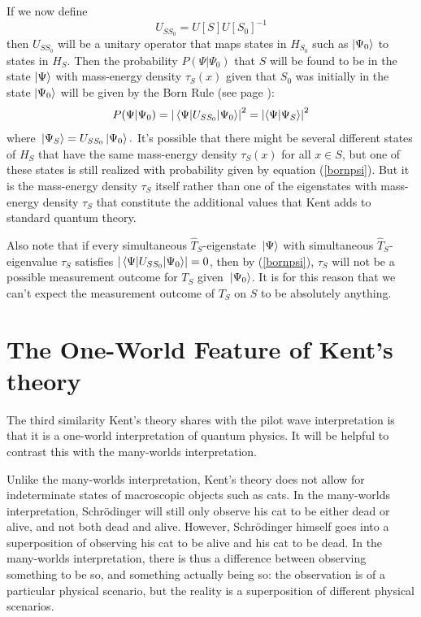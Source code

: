  If we now define 
 \begin{equation}\label{SchwingerUnitaryOP}
 U_{SS_0}=U[S]U[S_0]^{-1}
 \end{equation} 
 then $U_{SS_0}$ will be a unitary operator that maps states in $H_{S_0}$ such as $\ket{\Psi_0}$ to states in $H_S$. Then the probability $P(\Psi|\Psi_0)$ that  $S$ will be found to be in the state $\ket{\Psi}$ with mass-energy density $\tau_S(x)$ given that $S_0$ was initially in the state $\ket{\Psi_0}$ will be given by the Born Rule (see page \pageref{bornrule}):
 \begin{equation}\label{bornpsi}
 P(\Psi|\Psi_0) = \abs{\mel{\Psi}{U_{SS_0}}{\Psi_0}}^2=\abs{\ip{\Psi}{\Psi_S}}^2
 \end{equation}
 where $\ket*{\Psi_S}=U_{SS_0}\ket*{\Psi_0}.$
It's possible that there might be several different states of $H_S$ that have the same mass-energy density $\tau_S(x)$ for all $x\in S$, but one of these states is still realized with probability given by equation (\ref{bornpsi}). But it is the mass-energy density $\tau_S$ itself rather than one of the eigenstates with mass-energy density $\tau_S$ that constitute the additional values that Kent adds to standard quantum theory. 

Also note that  if every simultaneous $\hat{T}_S$-eigenstate $\ket*{\Psi}$ with simultaneous $\hat{T}_S$-eigenvalue $\tau_S$ satisfies $\abs{\mel{\Psi}{U_{SS_0}}{\Psi_0}}=0$, then by (\ref{bornpsi}), $\tau_S$ will not be a possible measurement outcome for $T_S$ given $\ket*{\Psi_0}$. It is for this reason that we can't expect the measurement outcome of $T_S$ on $S$ to be absolutely anything.

\section{The One-World Feature of Kent's theory}
The third similarity Kent's theory shares with the pilot wave interpretation is that it is a one-world interpretation of quantum physics. It will be helpful to contrast this with the many-worlds interpretation. 

 Unlike the many-worlds interpretation, Kent's theory does not allow for indeterminate states of macroscopic objects such as cats. In the many-worlds interpretation, Schr\"{o}dinger will still only observe his cat to be either dead or alive, and not both dead and alive. However, Schr\"{o}dinger himself goes into a superposition of observing his cat to be alive and his cat to be dead. In the many-worlds interpretation, there is thus a difference between observing something to be so, and something actually being so: the observation is of a particular physical scenario, but the reality is a superposition of different physical scenarios. 

